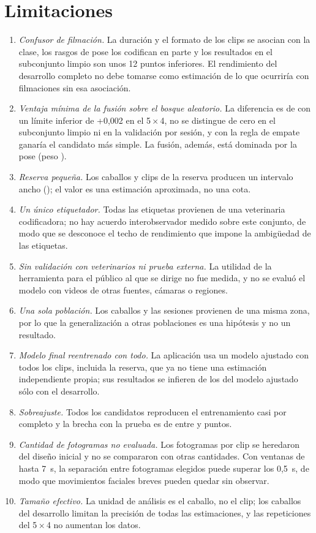 \section{Limitaciones}
\begin{enumerate}
  \item \textit{Confusor de filmación.} La duración y el formato de los clips se asocian con la clase, los rasgos de pose los codifican en parte y los resultados en el subconjunto limpio son unos 12 puntos inferiores. El rendimiento del desarrollo completo no debe tomarse como estimación de lo que ocurriría con filmaciones sin esa asociación.
  \item \textit{Ventaja mínima de la fusión sobre el bosque aleatorio.} La diferencia es de \DifFusionRFDev{} con un límite inferior de +0,002 en el 5\,$\times$\,4, no se distingue de cero en el subconjunto limpio ni en la validación por sesión, y con la regla de empate ganaría el candidato más simple. La fusión, además, está dominada por la pose (peso \PesoPose{}).
  \item \textit{Reserva pequeña.} Los \CaballosReserva{} caballos y \ClipsReserva{} clips de la reserva producen un intervalo ancho ({\FusionReservaIC{}}); el valor es una estimación aproximada, no una cota.
  \item \textit{Un único etiquetador.} Todas las etiquetas provienen de una veterinaria codificadora; no hay acuerdo interobservador medido sobre este conjunto, de modo que se desconoce el techo de rendimiento que impone la ambigüedad de las etiquetas.
  \item \textit{Sin validación con veterinarios ni prueba externa.} La utilidad de la herramienta para el público al que se dirige no fue medida, y no se evaluó el modelo con videos de otras fuentes, cámaras o regiones.
  \item \textit{Una sola población.} Los \CaballosTotal{} caballos y las \SesionesTotal{} sesiones provienen de una misma zona, por lo que la generalización a otras poblaciones es una hipótesis y no un resultado.
  \item \textit{Modelo final reentrenado con todo.} La aplicación usa un modelo ajustado con todos los clips, incluida la reserva, que ya no tiene una estimación independiente propia; sus resultados se infieren de los del modelo ajustado sólo con el desarrollo.
  \item \textit{Sobreajuste.} Todos los candidatos reproducen el entrenamiento casi por completo y la brecha con la prueba es de entre \FusionGap{} y \BaseGap{} puntos.
  \item \textit{Cantidad de fotogramas no evaluada.} Los \Fotogramas{} fotogramas por clip se heredaron del diseño inicial y no se compararon con otras cantidades. Con ventanas de hasta 7~s, la separación entre fotogramas elegidos puede superar los 0,5~s, de modo que movimientos faciales breves pueden quedar sin observar.
  \item \textit{Tamaño efectivo.} La unidad de análisis es el caballo, no el clip; los \CaballosDesarrollo{} caballos del desarrollo limitan la precisión de todas las estimaciones, y las repeticiones del 5\,$\times$\,4 no aumentan los datos.
\end{enumerate}

